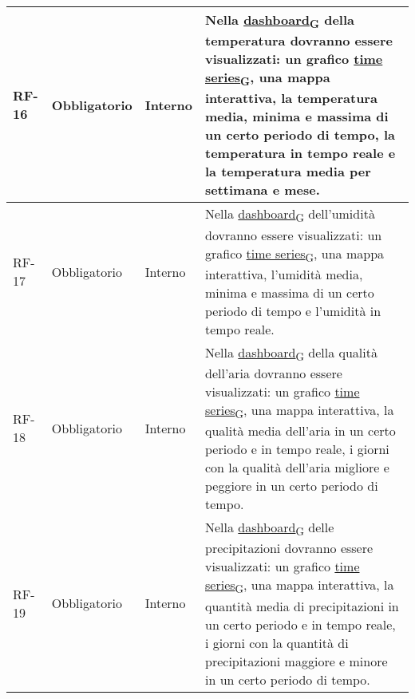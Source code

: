 \begin{longtable}{|>{\centering\arraybackslash}m{}|>{\centering\arraybackslash}m{}|>{\centering\arraybackslash}m{}|>{\centering\arraybackslash}m{}|}
	\\\hline
	RF-16           & Obbligatorio        & Interno                                                                                                           & Nella \href{https://7last.github.io/docs/rtb/documentazione-interna/glossario\#dashboard}{dashboard\textsubscript{G}} della temperatura dovranno essere visualizzati: un grafico \href{https://7last.github.io/docs/rtb/documentazione-interna/glossario\#time-series}{time series\textsubscript{G}}, una mappa interattiva, la temperatura media, minima e massima di un certo periodo di tempo, la temperatura in tempo reale e la temperatura media per settimana e mese.
	\\\hline
	RF-17           & Obbligatorio        & Interno                                                                                                           & Nella \href{https://7last.github.io/docs/rtb/documentazione-interna/glossario\#dashboard}{dashboard\textsubscript{G}} dell'umidità dovranno essere visualizzati: un grafico \href{https://7last.github.io/docs/rtb/documentazione-interna/glossario\#time-series}{time series\textsubscript{G}}, una mappa interattiva, l'umidità media, minima e massima di un certo periodo di tempo e l'umidità in tempo reale.
	\\\hline
	RF-18           & Obbligatorio        & Interno                                                                                                           & Nella \href{https://7last.github.io/docs/rtb/documentazione-interna/glossario\#dashboard}{dashboard\textsubscript{G}} della qualità dell'aria dovranno essere visualizzati: un grafico \href{https://7last.github.io/docs/rtb/documentazione-interna/glossario\#time-series}{time series\textsubscript{G}}, una mappa interattiva, la qualità media dell'aria in un certo periodo e in tempo reale, i giorni con la qualità dell'aria migliore e peggiore in un certo periodo di tempo.
	\\\hline
	RF-19           & Obbligatorio        & Interno                                                                                                           & Nella \href{https://7last.github.io/docs/rtb/documentazione-interna/glossario\#dashboard}{dashboard\textsubscript{G}} delle precipitazioni dovranno essere visualizzati: un grafico \href{https://7last.github.io/docs/rtb/documentazione-interna/glossario\#time-series}{time series\textsubscript{G}}, una mappa interattiva, la quantità media di precipitazioni in un certo periodo e in tempo reale, i giorni con la quantità di precipitazioni maggiore e minore in un certo periodo di tempo.

\end{longtable}
